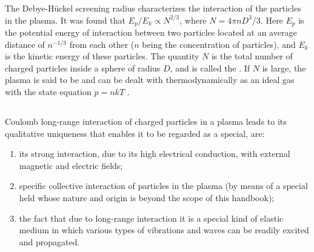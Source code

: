 The Debye-H\"uckel screening radius characterizes the interaction of the particles in the plasma. It was found that $E_{p}/E_{k} \propto N^{2/3}$, where $N = 4\pi n D^{3}/3$. Here $E_{p}$ is the potential energy of interaction between two particles located at an average distance of $n^{-1/3}$ from each other ($n$ being the concentration of particles), and $E_{k}$ is the kinetic energy of these particles. The quantity $N$ is the total number of charged particles inside a sphere of radius $D$, and is called the . If $N$ is large, the plasma is said to be  and can be dealt with thermodynamically as an ideal gas with the state equation $p = nkT$ .

\subsection{}\label{22.6.3} Coulomb long-range interaction of charged particles in a plasma leads to its qualitative uniqueness that enables it to be regarded as a special,  are:
\begin{enumerate}[label = (\alph*)]
\item its strong interaction, due to its high electrical conduction, with external magnetic and electric fields;
\item specific collective interaction of particles in the plasma (by means of a special held whose nature and origin is beyond the scope of this handbook);
\item the fact that due to long-range interaction it is a special kind of elastic medium in which various types of vibrations and waves can be readily excited and propagated.
\end{enumerate}
